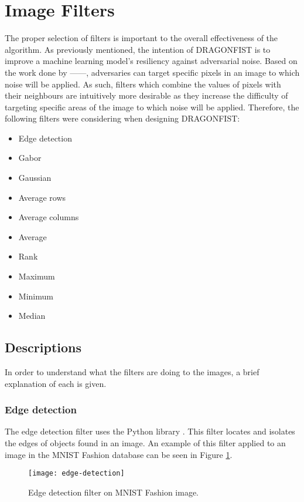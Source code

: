 \section{Image Filters} \label{s:filters}
	The proper selection of filters is important to the overall effectiveness of the algorithm. As previously mentioned, the intention of DRAGONFIST is to improve a machine learning model's resiliency against adversarial noise. Based on the work done by ------, adversaries can target specific pixels in an image to which noise will be applied. As such, filters which combine the values of pixels with their neighbours are intuitively more desirable as they increase the difficulty of targeting specific areas of the image to which noise will be applied. Therefore, the following filters were considering when designing DRAGONFIST:
	\begin{multicols}{2}
		\begin{itemize}
			\item Edge detection
			\item Gabor
			\item Gaussian
			\item Average rows
			\item Average columns
			\item Average
			\item Rank
			\item Maximum
			\item Minimum
			\item Median
		\end{itemize}
	\end{multicols}

	\subsection{Descriptions} \label{s:filters:descriptions}
		In order to understand what the filters are doing to the images, a brief explanation of each is given.

		\subsubsection{Edge detection} \label{s:filters:descriptions:edgeDetection}
			The edge detection filter uses the Python library  \cite{skikitImageFiltersSobel}. This filter locates and isolates the edges of objects found in an image. An example of this filter applied to an image in the MNIST Fashion database \cite{zalandoresearchFashionMNIST} can be seen in Figure \ref{f:filters:edgeDetection}.
			\begin{figure}
				\texttt{[image: edge-detection]}
				\caption{Edge detection filter on MNIST Fashion image.}
				\label{f:filters:edgeDetection}
			\end{figure}

